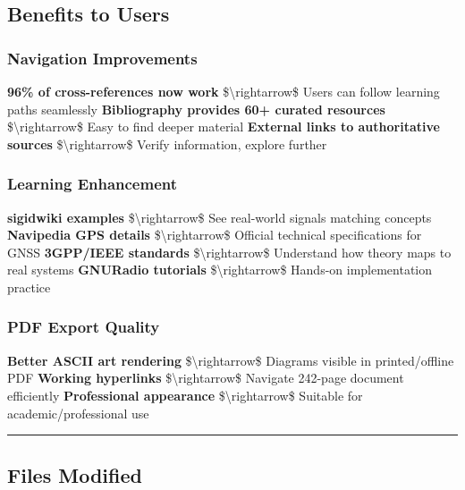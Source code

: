 \subsection{Benefits to Users}\label{benefits-to-users}

\subsubsection{Navigation Improvements}\label{navigation-improvements}

\textbf{96\% of cross-references now work} \$\textbackslash rightarrow\$
Users can follow learning paths seamlessly \textbf{Bibliography provides
60+ curated resources} \$\textbackslash rightarrow\$ Easy to find deeper
material \textbf{External links to authoritative sources}
\$\textbackslash rightarrow\$ Verify information, explore further

\subsubsection{Learning Enhancement}\label{learning-enhancement}

\textbf{sigidwiki examples} \$\textbackslash rightarrow\$ See real-world
signals matching concepts \textbf{Navipedia GPS details}
\$\textbackslash rightarrow\$ Official technical specifications for GNSS
\textbf{3GPP/IEEE standards} \$\textbackslash rightarrow\$ Understand
how theory maps to real systems \textbf{GNURadio tutorials}
\$\textbackslash rightarrow\$ Hands-on implementation practice

\subsubsection{PDF Export Quality}\label{pdf-export-quality}

\textbf{Better ASCII art rendering} \$\textbackslash rightarrow\$
Diagrams visible in printed/offline PDF \textbf{Working hyperlinks}
\$\textbackslash rightarrow\$ Navigate 242-page document efficiently
\textbf{Professional appearance} \$\textbackslash rightarrow\$ Suitable
for academic/professional use

\begin{center}\rule{0.5\linewidth}{0.5pt}\end{center}

\subsection{Files Modified}\label{files-modified}

